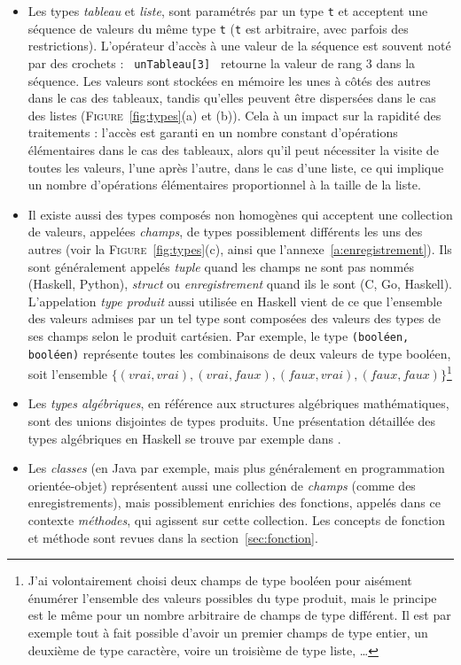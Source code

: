 \documentclass[a4paper,francais]{insalyon}
\begin{document}
\begin{itemize}
\item Les types \emph{tableau} et \emph{liste}, sont paramétrés par un type \texttt{t} et acceptent une séquence de valeurs du même type \texttt{t} (\texttt{t} est arbitraire, avec parfois des restrictions). L'opérateur d'accès à une valeur de la séquence est souvent noté par des crochets : \verb! unTableau[3] ! retourne la valeur de rang 3 dans la séquence. Les valeurs sont stockées en mémoire les unes à côtés des autres dans le cas des tableaux, tandis qu'elles peuvent être dispersées dans le cas des listes (\textsc{Figure}~\ref{fig:types}(a) et (b)). Cela à un impact sur la rapidité des traitements : l'accès est garanti en un nombre constant d'opérations élémentaires dans le cas des tableaux, alors qu'il peut nécessiter la visite de toutes les valeurs, l'une après l'autre, dans le cas d'une liste, ce qui implique un nombre d'opérations élémentaires proportionnel à la taille de la liste.
\item Il existe aussi des types composés non homogènes qui acceptent une collection de valeurs, appelées \emph{champs}, de types possiblement différents les uns des autres (voir la \textsc{Figure}~\ref{fig:types}(c), ainsi que l'annexe~\ref{a:enregistrement}). Ils sont généralement appelés \emph{tuple} quand les champs ne sont pas nommés (Haskell, Python), \emph{struct} ou \emph{enregistrement} quand ils le sont (C, Go, Haskell). L'appelation \emph{type produit} aussi utilisée en Haskell vient de ce que l'ensemble des valeurs admises par un tel type sont composées des valeurs des types de ses champs selon le produit cartésien. Par exemple, le type \verb!(booléen, booléen)! représente toutes les combinaisons de deux valeurs de type booléen, soit l'ensemble $\{ (vrai, vrai), (vrai, faux), (faux, vrai), (faux, faux) \}$\footnote{J'ai volontairement choisi deux champs de type booléen pour aisément énumérer l'ensemble des valeurs possibles du type produit, mais le principe est le même pour un nombre arbitraire de champs de type différent. Il est par exemple tout à fait possible d'avoir un premier champs de type entier, un deuxième de type caractère, voire un troisième de type liste, \ldots}   
\item Les \emph{types algébriques}, en référence aux structures algébriques mathématiques, sont des unions disjointes de types produits. Une présentation détaillée des types algébriques en Haskell se trouve par exemple dans \cite[chapitre 3]{haskell}.    
\item Les \emph{classes} (en Java par exemple, mais plus généralement en programmation orientée-objet) représentent aussi une collection de \emph{champs} (comme des enregistrements), mais possiblement enrichies des fonctions, appelés dans ce contexte \emph{méthodes}, qui agissent sur cette collection. Les concepts de fonction et méthode sont revues dans la section~\ref{sec:fonction}.
\end{itemize}
\end{document}
